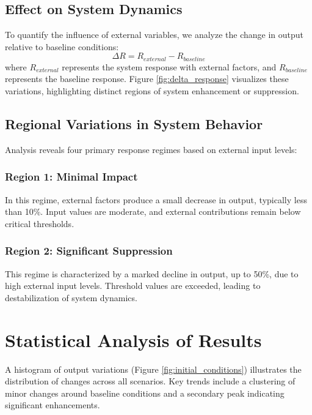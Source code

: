     \subsection{Effect on System Dynamics}
    To quantify the influence of external variables, we analyze the change in output relative to baseline conditions:
    \begin{equation}\label{delta_output}
        \Delta R = R_{external} - R_{baseline}
    \end{equation}
    where $R_{external}$ represents the system response with external factors, and $R_{baseline}$ represents the baseline response. Figure \ref{fig:delta_response} visualizes these variations, highlighting distinct regions of system enhancement or suppression.


    \subsection{Regional Variations in System Behavior}
    Analysis reveals four primary response regimes based on external input levels:
    \subsubsection*{Region 1: Minimal Impact}
    In this regime, external factors produce a small decrease in output, typically less than 10\%. Input values are moderate, and external contributions remain below critical thresholds.

    \subsubsection*{Region 2: Significant Suppression}
    This regime is characterized by a marked decline in output, up to 50\%, due to high external input levels. Threshold values are exceeded, leading to destabilization of system dynamics.



\section{Statistical Analysis of Results}
    A histogram of output variations (Figure \ref{fig:initial_conditions}) illustrates the distribution of changes across all scenarios. Key trends include a clustering of minor changes around baseline conditions and a secondary peak indicating significant enhancements.


